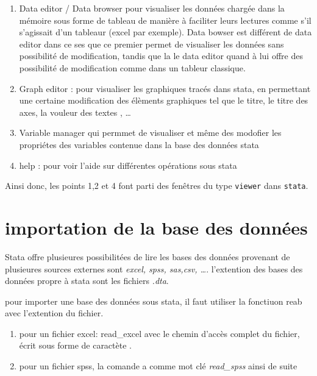 \documentclass[
]{book}
\providecommand{\tightlist}{%
  \setlength{\itemsep}{0pt}\setlength{\parskip}{0pt}}
\begin{document}
\begin{enumerate}
\def\labelenumi{(\arabic{enumi})}
\tightlist
\item
  Data editor / Data browser pour visualiser les données chargée dans la mémoire sous forme de tableau de manière à faciliter leurs lectures comme s'il s'agissait d'un tableaur (excel par exemple).
  Data bowser est différent de data editor dans ce ses que ce premier permet de visualiser les données sans possibilité de modification, tandis que la le data editor quand à lui offre des possibilité de modification comme dans un tableur classique.
\item
  Graph editor : pour visualiser les graphiques tracés dans stata, en permettant une certaine modification des élèments graphiques tel que le titre, le titre des axes, la vouleur des textes , \ldots{}
\item
  Variable manager qui permmet de visualiser et même des modofier les propriétes des variables contenue dans la base des données stata
\item
  help : pour voir l'aide sur différentes opérations sous stata
\end{enumerate}

Ainsi donc, les points 1,2 et 4 font parti des fenêtres du type \texttt{viewer} dans \texttt{stata}.

\hypertarget{importation-de-la-base-des-donnuxe9es}{%
\section{importation de la base des données}\label{importation-de-la-base-des-donnuxe9es}}

Stata offre plusieures possibilitées de lire les bases des données provenant de plusieures sources externes sont \emph{excel, spss, sas,csv, \ldots{}}.
l'extention des bases des données propre à stata sont les fichiers \emph{.dta}.

pour importer une base des données sous stata, il faut utiliser la fonctiuon reab avec l'extention du fichier.

\begin{enumerate}
\def\labelenumi{(\arabic{enumi})}
\tightlist
\item
  pour un fichier excel: read\_excel avec le chemin d'accès complet du fichier, écrit sous forme de caractète .
\item
  pour un fichier spss, la comande a comme mot clé \emph{read\_spss}
  ainsi de suite
\end{enumerate}
\end{document}
